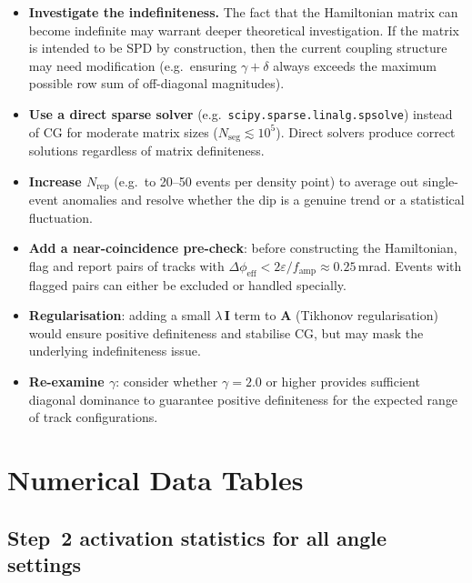 \documentclass[12pt,a4paper]{article}
\newcommand{\eps}{\varepsilon}
\begin{document}
\begin{itemize}
  \item \textbf{Investigate the indefiniteness.}
        The fact that the Hamiltonian matrix can become indefinite may warrant
        deeper theoretical investigation.
        If the matrix is intended to be SPD by construction, then the
        current coupling structure may need modification (e.g.\ ensuring
        $\gamma + \delta$ always exceeds the maximum possible row sum of
        off-diagonal magnitudes).
  \item \textbf{Use a direct sparse solver} (e.g.\
        \texttt{scipy.sparse.linalg.spsolve}) instead of CG for moderate
        matrix sizes ($N_\text{seg} \lesssim 10^5$).
        Direct solvers produce correct solutions regardless of matrix
        definiteness.
  \item \textbf{Increase $N_\text{rep}$} (e.g.\ to 20--50 events per density
        point) to average out single-event anomalies and resolve whether the
        dip is a genuine trend or a statistical fluctuation.
  \item \textbf{Add a near-coincidence pre-check}: before constructing the
        Hamiltonian, flag and report pairs of tracks with
        $\Delta\phi_\text{eff} < 2\eps/f_\text{amp} \approx 0.25$\,mrad.
        Events with flagged pairs can either be excluded or handled specially.
  \item \textbf{Regularisation}: adding a small $\lambda\,\mathbf{I}$ term
        to $\mathbf{A}$ (Tikhonov regularisation) would ensure positive
        definiteness and stabilise CG, but may mask the underlying
        indefiniteness issue.
  \item \textbf{Re-examine $\gamma$}: consider whether $\gamma = 2.0$
        or higher provides sufficient diagonal dominance to guarantee
        positive definiteness for the expected range of track configurations.
\end{itemize}

\appendix

\section{Numerical Data Tables}
\label{app:tables}

\subsection*{Step~2 activation statistics for all angle settings}
\end{document}
